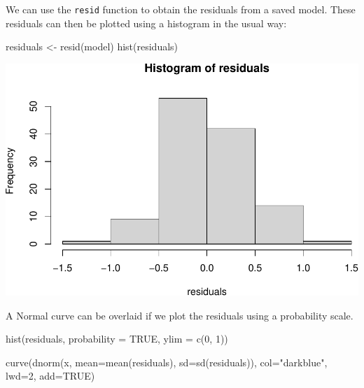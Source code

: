 \documentclass[
]{memoir}
\newenvironment{Shaded}{\begin{snugshade}}{\end{snugshade}}
\newcommand{\AttributeTok}[1]{\textcolor[rgb]{0.77,0.63,0.00}{#1}}
\newcommand{\ConstantTok}[1]{\textcolor[rgb]{0.00,0.00,0.00}{#1}}
\newcommand{\DecValTok}[1]{\textcolor[rgb]{0.00,0.00,0.81}{#1}}
\newcommand{\FunctionTok}[1]{\textcolor[rgb]{0.00,0.00,0.00}{#1}}
\newcommand{\NormalTok}[1]{#1}
\newcommand{\OtherTok}[1]{\textcolor[rgb]{0.56,0.35,0.01}{#1}}
\newcommand{\StringTok}[1]{\textcolor[rgb]{0.31,0.60,0.02}{#1}}
\begin{document}
We can use the \texttt{resid} function to obtain the residuals from a saved model. These residuals can then be plotted using a histogram in the usual way:

\begin{Shaded}
\begin{Highlighting}[]
\NormalTok{residuals }\OtherTok{\textless{}{-}} \FunctionTok{resid}\NormalTok{(model)}
\FunctionTok{hist}\NormalTok{(residuals)}
\end{Highlighting}
\end{Shaded}

\includegraphics{phcm9795-R-notes_files/figure-latex/unnamed-chunk-126-1.pdf}

A Normal curve can be overlaid if we plot the residuals using a probability scale.

\begin{Shaded}
\begin{Highlighting}[]
\FunctionTok{hist}\NormalTok{(residuals, }\AttributeTok{probability =} \ConstantTok{TRUE}\NormalTok{,}
     \AttributeTok{ylim =} \FunctionTok{c}\NormalTok{(}\DecValTok{0}\NormalTok{, }\DecValTok{1}\NormalTok{))}

\FunctionTok{curve}\NormalTok{(}\FunctionTok{dnorm}\NormalTok{(x, }\AttributeTok{mean=}\FunctionTok{mean}\NormalTok{(residuals), }\AttributeTok{sd=}\FunctionTok{sd}\NormalTok{(residuals)), }
      \AttributeTok{col=}\StringTok{"darkblue"}\NormalTok{, }\AttributeTok{lwd=}\DecValTok{2}\NormalTok{, }\AttributeTok{add=}\ConstantTok{TRUE}\NormalTok{)}
\end{Highlighting}
\end{Shaded}
\end{document}
